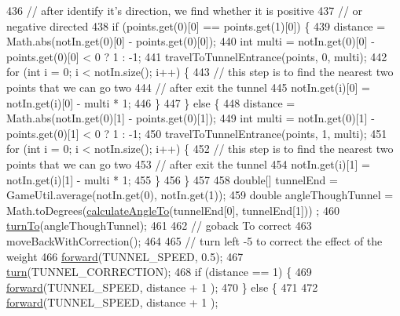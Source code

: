 \begin{DoxyCode}
436     \textcolor{comment}{// after identify it's direction, we find whether it is positive}
437     \textcolor{comment}{// or negative directed}
438     \textcolor{keywordflow}{if} (points.get(0)[0] == points.get(1)[0]) \{
439       distance = Math.abs(notIn.get(0)[0] - points.get(0)[0]);
440       \textcolor{keywordtype}{int} multi = notIn.get(0)[0] - points.get(0)[0] < 0 ? 1 : -1;
441       travelToTunnelEntrance(points, 0, multi);
442       \textcolor{keywordflow}{for} (\textcolor{keywordtype}{int} i = 0; i < notIn.size(); i++) \{
443         \textcolor{comment}{// this step is to find the nearest two points that we can go two}
444         \textcolor{comment}{// after exit the tunnel}
445         notIn.get(i)[0] = notIn.get(i)[0] - multi * 1;
446       \}
447     \} \textcolor{keywordflow}{else} \{
448       distance = Math.abs(notIn.get(0)[1] - points.get(0)[1]);
449       \textcolor{keywordtype}{int} multi = notIn.get(0)[1] - points.get(0)[1] < 0 ? 1 : -1;
450       travelToTunnelEntrance(points, 1, multi);
451       \textcolor{keywordflow}{for} (\textcolor{keywordtype}{int} i = 0; i < notIn.size(); i++) \{
452         \textcolor{comment}{// this step is to find the nearest two points that we can go two}
453         \textcolor{comment}{// after exit the tunnel}
454         notIn.get(i)[1] = notIn.get(i)[1] - multi * 1;
455       \}
456     \}
457 
458     \textcolor{keywordtype}{double}[] tunnelEnd = GameUtil.average(notIn.get(0), notIn.get(1));
459     \textcolor{keywordtype}{double} angleThoughTunnel = Math.toDegrees(\hyperlink{classca_1_1mcgill_1_1ecse211_1_1project_1_1_navigation_a4376e54162df8f123ca3b52e4fd2f38d}{calculateAngleTo}(tunnelEnd[0], tunnelEnd[1]))
      ;
460     \hyperlink{classca_1_1mcgill_1_1ecse211_1_1project_1_1_navigation_a3bbe0645f2b3b3d0986b4a707fb5a00c}{turnTo}(angleThoughTunnel);
461 
462     \textcolor{comment}{// goback To correct}
463       moveBackWithCorrection();
464 
465     \textcolor{comment}{// turn left -5 to correct the effect of the weight}
466     \hyperlink{classca_1_1mcgill_1_1ecse211_1_1project_1_1_navigation_a7c66610c5b7496ddb35d342ab2cd3f08}{forward}(TUNNEL\_SPEED, 0.5);
467     \hyperlink{classca_1_1mcgill_1_1ecse211_1_1project_1_1_navigation_ad74286ad36d333bfaf57661837457b76}{turn}(TUNNEL\_CORRECTION);
468     \textcolor{keywordflow}{if} (distance == 1) \{
469       \hyperlink{classca_1_1mcgill_1_1ecse211_1_1project_1_1_navigation_a7c66610c5b7496ddb35d342ab2cd3f08}{forward}(TUNNEL\_SPEED, distance + 1 );
470     \} \textcolor{keywordflow}{else} \{
471 
472       \hyperlink{classca_1_1mcgill_1_1ecse211_1_1project_1_1_navigation_a7c66610c5b7496ddb35d342ab2cd3f08}{forward}(TUNNEL\_SPEED, distance + 1 );

\end{DoxyCode}

